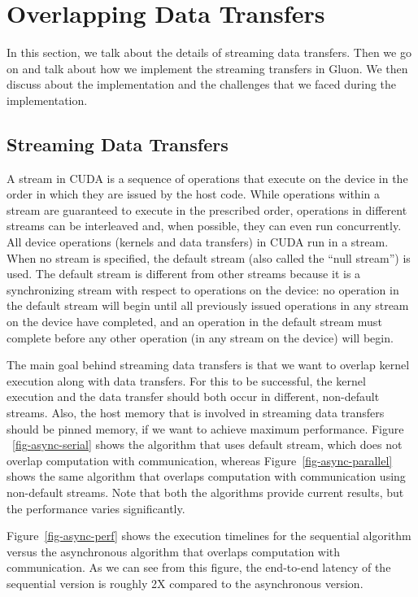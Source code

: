 \section{Overlapping Data Transfers}
\label{sec-async}

In this section, we talk about the details of streaming data transfers. Then we go on and talk about how we implement the streaming transfers in Gluon. We then discuss about the implementation and the challenges that we faced during the implementation. 

\subsection{Streaming Data Transfers}

A stream in CUDA is a sequence of operations that execute on the device in the order in which they are issued by the host code. While operations within a stream are guaranteed to execute in the prescribed order, operations in different streams can be interleaved and, when possible, they can even run concurrently. All device operations (kernels and data transfers) in CUDA run in a stream. When no stream is specified, the default stream (also called the “null stream”) is used. The default stream is different from other streams because it is a synchronizing stream with respect to operations on the device: no operation in the default stream will begin until all previously issued operations in any stream on the device have completed, and an operation in the default stream must complete before any other operation (in any stream on the device) will begin.



The main goal behind streaming data transfers is that we want to overlap kernel execution along with data transfers. For this to be successful, the kernel execution and the data transfer should both occur in different, non-default streams. Also, the host memory that is involved in streaming data transfers should be pinned memory, if we want to achieve maximum performance. Figure ~\ref{fig-async-serial} shows the algorithm that uses default stream, which does not overlap computation with communication, whereas Figure~\ref{fig-async-parallel} shows the same algorithm that overlaps computation with communication using non-default streams. Note that both the algorithms provide current results, but the performance varies significantly. 


Figure~\ref{fig-async-perf} shows the execution timelines for the sequential algorithm versus the asynchronous algorithm that overlaps computation with communication. As we can see from this figure, the end-to-end latency of the sequential version is roughly 2X compared to the asynchronous version. 

